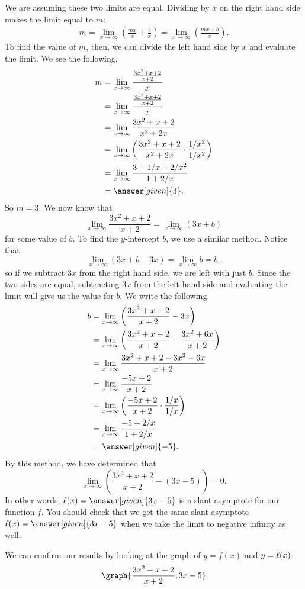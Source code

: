 \documentclass{ximera}
\begin{document}
\begin{example}
\begin{explanation}
    We are assuming these two limits are equal.  Dividing by $x$ on the right hand side makes the limit equal to $m$:
    \begin{align*}
    m = \lim_{x \to \infty} \left(\frac{mx}{x} + \frac{b}{x}\right) = \lim_{x \to \infty} \left(\frac{mx+b}{x}\right).
    \end{align*}
    To find the value of $m$, then, we can divide the left hand side by $x$ and evaluate the limit.   We see the following. 
    \begin{align*}
      m &=\lim_{x\to\infty}\frac{\frac{3x^2+x+2}{x+2}}{x}\\
      &= \lim_{x\to\infty}\frac{\frac{3x^2+x+2}{x+2}}{x}\\
      &= \lim_{x\to\infty}\frac{3x^2+x+2}{x^2+2x}\\
      &= \lim_{x\to\infty}\left(\frac{3x^2+x+2}{x^2+2x}\cdot\frac{1/x^2}{1/x^2}\right)\\
      &= \lim_{x\to\infty}\frac{3+1/x+2/x^2}{1+2/x}\\
      &= \answer[given]{3}.
    \end{align*}
    So $m=3$.  We now know that
    \[
    \lim_{x \to \infty}\frac{3x^2 +x+2}{x+2} = \lim_{x \to \infty} (3x + b)
    \]
    for some value of $b$.  To find the $y$-intercept $b$, we use a similar method.  Notice that
    \[
    \lim_{x \to \infty}( 3x + b - 3x )= \lim_{x \to \infty} b = b,
    \]
    so if we subtract $3x$ from the right hand side, we are left with just $b$.  Since the two sides are equal, subtracting $3x$ from the left hand side and evaluating the limit will give us the value for $b$.  We write the following.
    \begin{align*}
      b &=\lim_{x\to\infty} \left(\frac{3x^2+x+2}{x+2} - 3x\right)\\
      &=\lim_{x\to\infty} \left( \frac{3x^2+x+2}{x+2} - \frac{3x^2 + 6x}{x+2}\right) \\
      &=\lim_{x\to\infty} \frac{3x^2+x+2-3x^2-6x}{x+2}\\
      &=\lim_{x\to\infty}  \frac{-5x+2}{x+2}\\
      &=\lim_{x\to\infty} \left(\frac{-5x+2}{x+2}\cdot\frac{1/x}{1/x}\right)\\
      &=\lim_{x\to\infty} \frac{-5+2/x}{1+2/x}\\
      &= \answer[given]{-5}.
    \end{align*}
    By this method, we have determined that 
    \[
    \lim_{x\to\infty}\left(\frac{3x^2+x+2}{x+2} - (3x-5) \right) = 0.
    \]
   In other words, $\l(x) = \answer[given]{3x-5}$ is a slant asymptote
   for our function $f$.  You should check that we get the same slant
   asymptote $\l(x) = \answer[given]{3x-5}$ when we take the limit to
   negative infinity as well.
   \begin{prompt}
     We can confirm our results by looking at the graph of $y=f(x)$
     and $y=\ell(x)$:
     \[
     \graph{\frac{3x^2+x+2}{x+2}, 3x-5}
     \]
   \end{prompt}
  \end{explanation}
\end{example}
\end{document}
